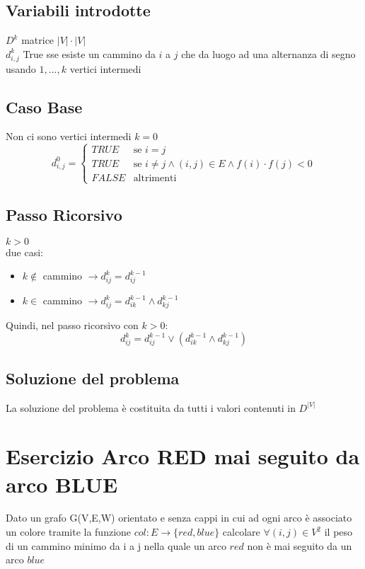 \documentclass[12pt, a4paper, openany]{book}
\begin{document}
\subsection*{Variabili introdotte}
$D^k$ matrice $|V|\cdot|V|$
\\$d^k_{i,j}$ True sse esiste un cammino da $i$ a $j$ che da luogo ad una alternanza di segno usando ${1,...,k}$ vertici intermedi

\subsection*{Caso Base} Non ci sono vertici intermedi $k=0$
\begin{equation*}
	d^0_{i,j} = \begin{cases}
		TRUE  & \text{se $i=j$}                                                  \\
		TRUE  & \text{se $i\neq j \land (i,j) \in E \land f(i) \cdot f(j) < 0 $} \\
		FALSE & \text{altrimenti}
	\end{cases}
\end{equation*}

\subsection*{Passo Ricorsivo} $k>0$\\
due casi:
\begin{itemize}
	\item $k\notin$ cammino $\rightarrow d^k_{ij} = d^{k-1}_{ij}$
	\item $k \in$ cammino $\rightarrow d^k_{ij} = d^{k-1}_{ik} \land d^{k-1}_{kj}$
\end{itemize}
Quindi, nel passo ricorsivo con $k>0$:
\begin{equation*}
	d^k_{ij} = d^{k-1}_{ij} \lor  (d^{k-1}_{ik} \land d^{k-1}_{kj})
\end{equation*}

\subsection*{Soluzione del problema}
La soluzione del problema è costituita da tutti i valori contenuti in $D^{|V|}$

\section{Esercizio Arco RED mai seguito da arco BLUE}
Dato un grafo G(V,E,W) orientato e senza cappi in cui ad ogni arco è associato un colore tramite la funzione $col: E\rightarrow \{red,blue\}$
calcolare $\forall (i,j) \in V^2$ il peso di un cammino minimo da i a j nella quale un arco $red$ non è mai seguito da un arco $blue$
\end{document}
